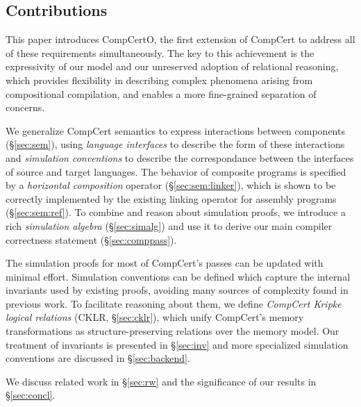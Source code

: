 \documentclass[acmsmall,screen,review,anonymous]{acmart}
\begin{document}
\subsection{Contributions} %

This paper introduces CompCertO,
the first extension of CompCert to address
all of these requirements simultaneously.
The key to this achievement
is the expressivity of our model
and our unreserved adoption of relational reasoning,
which provides flexibility in
describing complex phenomena
arising from compositional compilation,
and enables a more fine-grained separation of concerns.

We generalize CompCert semantics
to express interactions between components (\S\ref{sec:sem}),
using \emph{language interfaces}
to describe the form of these interactions
and \emph{simulation conventions}
to describe the correspondance between the interfaces
of source and target languages.
The behavior of
composite programs is specified by a
\emph{horizontal composition} operator (\S\ref{sec:sem:linker}),
which is shown to be correctly implemented
by the existing linking operator for assembly programs
(\S\ref{sec:sem:ref}).
To combine and reason about simulation proofs,
we introduce a rich \emph{simulation algebra} (\S\ref{sec:simalg})
and use it to derive our main compiler correctness statement
(\S\ref{sec:comppass}).

The simulation proofs for
most of CompCert's passes
can be updated with minimal effort.
Simulation conventions can be defined
which capture the internal invariants
used by existing proofs,
avoiding many sources of complexity found
in previous work.
To facilitate reasoning about
them, %
we define \emph{CompCert Kripke logical relations}
(CKLR, \S\ref{sec:cklr}),
which unify
CompCert's memory transformations
as structure-preserving relations
over the memory model.
Our treatment of invariants is presented in \S\ref{sec:inv}
and more specialized simulation conventions
are discussed in \S\ref{sec:backend}.

We discuss related work in \S\ref{sec:rw}
and %
the significance of our results in \S\ref{sec:concl}.



\end{document}
